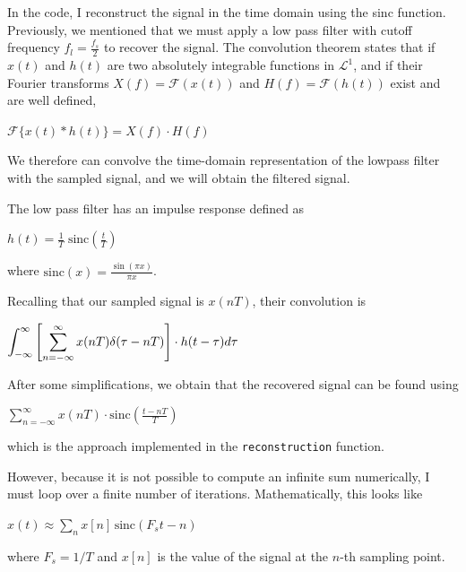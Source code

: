 \documentclass{article}
\begin{document}
In the code, I reconstruct the signal in the time domain using the sinc function.
Previously, we mentioned that we must apply a low pass filter with cutoff frequency $f_l = \frac{f_s}{2}$ to recover the signal.
The convolution theorem states that if $x(t)$ and $h(t)$ are two absolutely integrable functions in $\mathcal{L}^1$, and if their Fourier transforms $X(f) = \mathcal{F}(x(t))$ and $H(f) = \mathcal{F}(h(t))$ exist and are well defined,
\begin{center}
    \begin{math}
       \displaystyle \mathcal{F}\{ x(t) * h(t) \} = X(f) \cdot H(f)
    \end{math}
\end{center}
We therefore can convolve the time-domain representation of the lowpass filter with the sampled signal, and we will obtain the filtered signal.

The low pass filter has an impulse response defined as
\begin{center}
    \begin{math}
        h(t) = \displaystyle \frac{1}{T} \; \text{sinc} \left( \frac{t}{T} \right)
    \end{math}
\end{center}
where $\text{sinc}(x) = \frac{\sin(\pi x)}{\pi x}$.

Recalling that our sampled signal is $x(nT)$, their convolution is
\begin{center}
    \begin{math}
        \displaystyle \int_{-\infty}^{\infty} \displaystyle \left [ \sum_{n=-\infty}^{\infty} x(nT) \delta (\tau - nT) \displaystyle \right ] \cdot h(t - \tau) d\tau
    \end{math}
\end{center}

After some simplifications, we obtain that the recovered signal can be found using
\begin{center}
    \begin{math}
        \displaystyle \sum_{n = -\infty}^{\infty} x(nT) \cdot \text{sinc} \left( \frac{t-nT}{T} \right)
    \end{math}
\end{center}
which is the approach implemented in the \verb|reconstruction| function.

However, because it is not possible to compute an infinite sum numerically, I must loop over a finite number of iterations. Mathematically, this looks like
\begin{center}
    \begin{math}
        x(t) \approx \displaystyle\sum_{n}^{} x[n]\, \text{sinc}\left( F_st - n \right)
    \end{math}  
\end{center}
where $F_s = 1/T$ and $x[n]$ is the value of the signal at the $n$-th sampling point.
\end{document}
